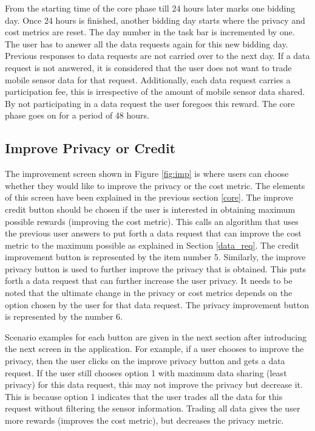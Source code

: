 From the starting time of the core phase till 24 hours later marks one bidding day. Once 24 hours is finished, another bidding day starts where the privacy and cost metrics are reset. The day number in the task bar is incremented by one. The user has to answer all the data requests again for this new bidding day. Previous responses to data requests are not carried over to the next day. If a data request is not answered, it is considered that the user does not want to trade mobile sensor data for that request. Additionally, each data request carries a participation fee, this is irrespective of the amount of mobile sensor data shared. By not participating in a data request the user foregoes this reward.
The core phase goes on for a period of 48 hours. 

\subsection{Improve Privacy or Credit}

The improvement screen shown in Figure \ref{fig:imp} is where users can choose whether they would like to improve the privacy or the cost metric. The elements of this screen have been explained in the previous section \ref{core}.
The improve credit button
should be chosen if the user is interested in obtaining maximum possible rewards (improving the cost metric). This calls an algorithm that uses the previous user answers to
put forth a data request that can improve the cost metric to the maximum possible as explained in Section \ref{data_req}. The credit improvement button is represented by the item number 5. Similarly, the improve privacy button is used to further improve the privacy that is obtained. This puts forth a data request that can further increase the user privacy. It needs to be noted that the ultimate change in the privacy or cost metrics depends on the option chosen by the user for that data request. The privacy improvement button is represented by the number 6.

Scenario examples for each button are given in the next section after introducing the next screen in the application. For example, if a user chooses to improve the privacy, then the user clicks on the improve privacy button and gets a data request. If the user still chooses option 1 with maximum data sharing (least privacy) for this data request, this may not improve the privacy but decrease it. This is because option 1 indicates that the user trades all the data for this request without filtering the sensor information. Trading all data gives the user more rewards (improves the cost metric), but decreases the privacy metric.


